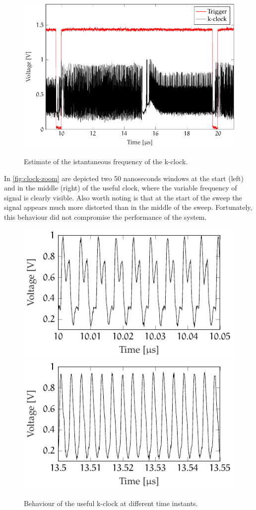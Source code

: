 \begin{figure}[hbt]
	\myfloatalign
	{\includegraphics[width=0.8\linewidth]{gfx/ch3/clock}}\\
	\caption{Estimate of the istantaneous frequency of the k-clock.}\label{fig:kclock}
\end{figure}

In \autoref{fig:clock-zoom} are depicted two 50 nanoseconds windows at the start (left) and in the middle (right) of the useful clock, where the variable frequency of signal is clearly visible. Also worth noting is that at the start of the sweep the signal appears much more distorted than in the middle of the sweep. Fortunately, this behaviour did not compromise the performance of the system. 

\begin{figure}[bth]
	\myfloatalign
	{\includegraphics[width=.45\linewidth]{gfx/ch3/clock1}} \quad
	{\includegraphics[width=.45\linewidth]{gfx/ch3/clock2}} \\
	\caption{Behaviour of the useful k-clock at different time instants.}\label{fig:clock-zoom}
\end{figure}

